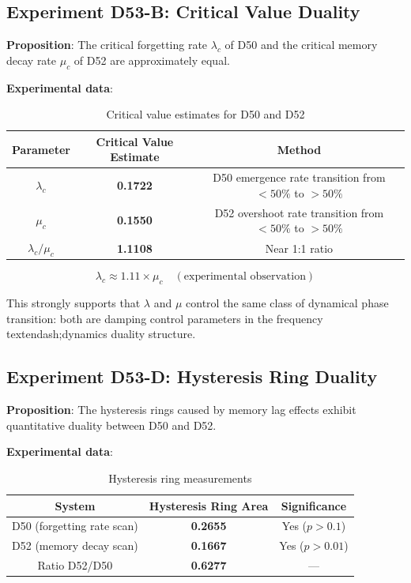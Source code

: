 \documentclass[12pt, a4paper]{article}
\begin{document}
\subsection{Experiment D53-B: Critical Value Duality}

\textbf{Proposition}: The critical forgetting rate $\lambda_c$ of D50 and the critical memory decay rate $\mu_c$ of D52 are approximately equal.

\textbf{Experimental data}:

\begin{table}[h]
\centering
\begin{tabular}{c c c}
\toprule
Parameter & Critical Value Estimate & Method \\
\midrule
$\lambda_c$ & \textbf{0.1722} & D50 emergence rate transition from $<\!50\%$ to $>\!50\%$ \\
$\mu_c$ & \textbf{0.1550} & D52 overshoot rate transition from $<\!50\%$ to $>\!50\%$ \\
$\lambda_c / \mu_c$ & \textbf{1.1108} & Near 1:1 ratio \\
\bottomrule
\end{tabular}
\caption{Critical value estimates for D50 and D52}
\end{table}

\begin{equation}
\lambda_c \approx 1.11 \times \mu_c \quad (\text{experimental observation})
\end{equation}

This strongly supports that $\lambda$ and $\mu$ control the same class of dynamical phase transition: both are damping control parameters in the frequency\\textendash;dynamics duality structure.

\subsection{Experiment D53-D: Hysteresis Ring Duality}

\textbf{Proposition}: The hysteresis rings caused by memory lag effects exhibit quantitative duality between D50 and D52.

\textbf{Experimental data}:

\begin{table}[h]
\centering
\begin{tabular}{c c c}
\toprule
System & Hysteresis Ring Area & Significance \\
\midrule
D50 (forgetting rate scan) & \textbf{0.2655} & Yes ($p > 0.1$) \\
D52 (memory decay scan) & \textbf{0.1667} & Yes ($p > 0.01$) \\
Ratio D52/D50 & \textbf{0.6277} & --- \\
\bottomrule
\end{tabular}
\caption{Hysteresis ring measurements}
\end{table}
\end{document}
